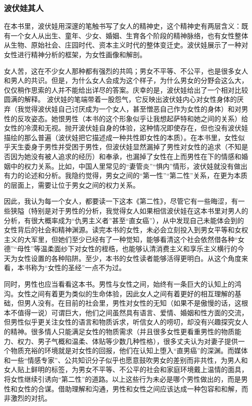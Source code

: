 \subsubsection{波伏娃其人}
在本书里，波伏娃用深邃的笔触书写了女人的精神史，这个精神史有两层含义：既有一个女人从出生、童年、少女、婚姻、生育各个阶段的精神脉络，也有女性整体从生物、原始社会、庄园时代、资本主义时代的整体变迁史。波伏娃展示了一种对女性进行精神分析的框架，为女性画像和解剖。

女人苦，这在不少女人那种都有强烈的共鸣；男女不平等、不公平，也是很多女人和男人的共识。但是，为什么女人会成为这个样子，为什么男女的分野会这么大，仅仅稍作思索的人并不能给出详尽的答案。庆幸的是，波伏娃给出了一个相对比较圆满的解释。
波伏娃的笔端带着一股怨气，它反映出波伏娃内心对女性身体的厌弃（我觉得波伏娃自己讨厌成为一个女人，甚至憎恶自己作为女性的身体）和对男性的反攻姿态。她恨男性（本书的这个形象似乎让我想起萨特和她之间的关系）给女性的冷漠和无视。抛开波伏娃自身的体验，这种情况即使存在，但也没有波伏娃描绘的那么普遍（波伏娃把它描述成一种共性即女性的本质）。在本书里，女性似乎天生委身于男性并受困于男性，但波伏娃显然漏掉了男性对女性的追求（不知是否因为她没有被人追求的经历）和奉承，也漏掉了女性在上而男性在下的情感和婚姻中的权力关系。比如，中国人里常见的“妻管炎”“惧内”情形，波伏娃就没有做出有力的论述和分析。我隐约觉得，男女之间的“第一性”“第二性”关系，在更为本质的层面上，需要让位于男女之间的权力关系。

因此，我认为每一个女人，都要读一下这本《第二性》，尽管它有一些晦涩，有一些狭隘（特别是对于男性的分析，我觉得女人如果相信波伏娃在这本书里对男人的分析，有很大概率成为“仇男主义者”甚至“直女癌”），从中发现自己未能体会到的女性背后的社会和精神渊源。读完本书的女性，未必会立刻投入到男女平等和女权主义的大军里，但她们至少已经有了一种觉知，能够看清这个社会依然借各种“女德”“母性”等温柔面纱下对女性的桎梏，也能够认清消费主义和享乐主义横行的今天为女性设置的各种陷阱。至少，本书的女性读者能够活得更明白。从这个角度来看，本书称为“女性的圣经”一点不为过。

同时，男性也应当看看这本书。男性与女性之间，始终有一条巨大的认知上的鸿沟。女性之间有着更为类似的生命体验，因此女人之间有着更好的相互理解的基础，但男人没有。在目前的社会里，男性对女性的无知（如果不是傲慢的话，这根本不值得一说）可谓巨大，他们之间虽然具有语言、爱情、婚姻和性方面的交流，但男性似乎更关注女性的语言和物质诉求，听信女人的唠叨，却没有兴趣探究女人的精神。很多情人只能满足女性的物质需求（并且很多女性更看重男性的物质能力、权力、男子气概和温柔、体贴等少数几种性格），很多丈夫认为对妻子提供一个物质充裕的环境就是对女性的回报，他们在认知上堕入“直男癌”的深渊。而媒体和一些“情感专家”、公共知识分子似乎也愿意鼓吹男女的差别而非共性，为男人和女人贴上鲜明的标签，为男女不平等、不公平的社会和家庭环境戴上温情的面具，将女性继续引诱向“第二性”的道路。以上这些行为未必是哪个男性做出的，而是男性和女性的合谋。借助理解和沟通，男性和女性之间应该达成一种包容和和解，而非激烈的对抗。

